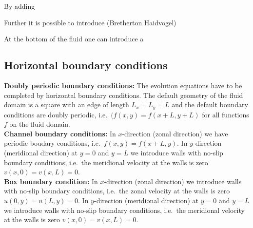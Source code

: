 By adding 

Further it is possible to introduce  
(Bretherton Haidvogel)

      At the bottom of the fluid one can introduce a 
%
\subsection{Horizontal boundary conditions}
%
{\bf Doubly periodic boundary conditions:} The evolution equations have to be completed by horizontal boundary 
conditions. The default geometry of the fluid domain is a square 
with an edge of length $L_{x} = L_{y} = L$ and the default boundary 
conditions are doubly periodic, i.e.\ $(f(x,y) = f(x+L,y+L)$ for all 
functions $f$ on the fluid domain. \\

\noindent
{\bf Channel boundary conditions:} In $x$-direction (zonal direction) 
we have periodic boudary conditions, i.e.\ $f(x,y) = f(x+L,y)$. 
In $y$-direction (meridional direction) at $y=0$ and $y=L$ we introduce 
walls with no-slip boundary conditions, i.e.\ the meridional velocity at 
the walls is zero $v(x,0) = v(x,L) =  0$. \\

\noindent
{\bf Box boundary condition:} In $x$-direction (zonal direction) 
we introduce walls with no-slip boundary conditions, i.e.\ the zonal 
velocity at the walls is zero $u(0,y) = u(L,y) = 0$. In $y$-direction 
(meridional direction) at $y=0$ and $y=L$ we introduce walls with 
no-slip boundary conditions, i.e.\ the meridional velocity at the walls 
is zero $v(x,0) = v(x,L) =  0$.
